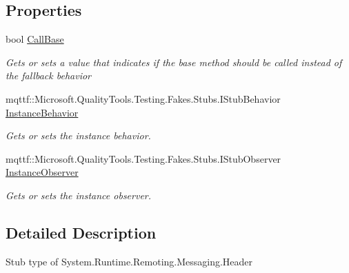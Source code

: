\subsection*{Properties}
\begin{DoxyCompactItemize}
\item 
bool \hyperlink{class_system_1_1_runtime_1_1_remoting_1_1_messaging_1_1_fakes_1_1_stub_header_a5c0ab022e7819e4d5402610a34c3e40c}{Call\-Base}
\begin{DoxyCompactList}\small\item\em Gets or sets a value that indicates if the base method should be called instead of the fallback behavior\end{DoxyCompactList}\item 
mqttf\-::\-Microsoft.\-Quality\-Tools.\-Testing.\-Fakes.\-Stubs.\-I\-Stub\-Behavior \hyperlink{class_system_1_1_runtime_1_1_remoting_1_1_messaging_1_1_fakes_1_1_stub_header_abdf17f18de22bcb648a2948e62e63c2e}{Instance\-Behavior}
\begin{DoxyCompactList}\small\item\em Gets or sets the instance behavior.\end{DoxyCompactList}\item 
mqttf\-::\-Microsoft.\-Quality\-Tools.\-Testing.\-Fakes.\-Stubs.\-I\-Stub\-Observer \hyperlink{class_system_1_1_runtime_1_1_remoting_1_1_messaging_1_1_fakes_1_1_stub_header_a09ec4345f25e5c08edea64b9acc62962}{Instance\-Observer}
\begin{DoxyCompactList}\small\item\em Gets or sets the instance observer.\end{DoxyCompactList}\end{DoxyCompactItemize}


\subsection{Detailed Description}
Stub type of System.\-Runtime.\-Remoting.\-Messaging.\-Header



